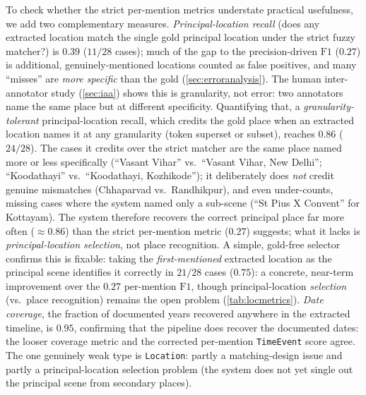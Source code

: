 \documentclass[conference]{IEEEtran}
\newcommand{\node}[1]{\texttt{#1}}
\begin{document}
To check whether the strict per-mention metrics understate practical usefulness,
we add two complementary measures. \emph{Principal-location recall} (does any
extracted location match the single gold principal location under the strict
fuzzy matcher?) is $0.39$ ($11/28$ cases); much of the gap to the precision-driven
$\mathrm{F1}$ ($0.27$) is additional, genuinely-mentioned locations counted as
false positives, and many ``misses'' are \emph{more specific} than the gold
(\cref{sec:erroranalysis}). The human inter-annotator study (\cref{sec:iaa}) shows
this is granularity, not error: two annotators name the same place but at different
specificity. Quantifying that, a \emph{granularity-tolerant} principal-location
recall, which credits the gold place when an extracted location names it at any
granularity (token superset or subset), reaches $\mathbf{0.86}$ ($24/28$). The
cases it credits over the strict matcher are the same place named more or less
specifically (``Vasant Vihar'' vs.\ ``Vasant Vihar, New Delhi''; ``Koodathayi''
vs.\ ``Koodathayi, Kozhikode''); it deliberately does \emph{not} credit genuine
mismatches (Chhaparvad vs.\ Randhikpur), and even under-counts, missing cases
where the system named only a sub-scene (``St Pius X Convent'' for Kottayam). The
system therefore recovers the correct principal place far more often
($\approx\!0.86$) than the strict per-mention metric ($0.27$) suggests; what it
lacks is \emph{principal-location selection}, not place recognition. A simple,
gold-free selector confirms this is fixable: taking the \emph{first-mentioned}
extracted location as the principal scene identifies it correctly in $21/28$ cases
($0.75$): a concrete, near-term improvement over the $0.27$ per-mention
$\mathrm{F1}$, though principal-location \emph{selection} (vs.\ place recognition)
remains the open problem (\cref{tab:locmetrics}).
\emph{Date coverage}, the fraction of documented years recovered anywhere in the
extracted timeline, is $0.95$, confirming that the pipeline does recover the
documented dates: the looser coverage metric and the corrected per-mention
\node{TimeEvent} score agree. The one genuinely weak type is \node{Location}:
partly a matching-design issue and partly a principal-location selection problem
(the system does not yet single out the principal scene from secondary places).
\end{document}
